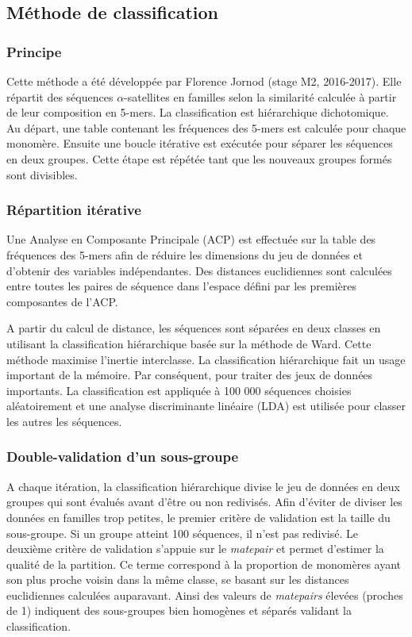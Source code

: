 \documentclass[12pt,a4paper]{article}
\begin{document}
\subsection{Méthode de classification}
	\subsubsection{Principe}
Cette méthode a été développée par Florence Jornod (stage M2, 2016-2017). Elle répartit des séquences $\alpha$-satellites en familles selon la similarité calculée à partir de leur composition en 5-mers. La classification est hiérarchique dichotomique. Au départ, une table contenant les fréquences des 5-mers est calculée pour chaque monomère. Ensuite une boucle itérative est exécutée pour séparer les séquences en deux groupes. Cette étape est répétée tant que les nouveaux groupes formés sont divisibles.

	\subsubsection{Répartition itérative}
Une Analyse en Composante Principale (ACP) est effectuée sur la table des fréquences des 5-mers afin de réduire les dimensions du jeu de données et d’obtenir des variables indépendantes. Des distances euclidiennes sont calculées entre toutes les paires de séquence dans l’espace défini par les premières composantes de l’ACP. 

A partir du calcul de distance, les séquences sont séparées en deux classes en utilisant la classification hiérarchique basée sur la méthode de Ward. Cette méthode maximise l’inertie interclasse. La classification hiérarchique fait un usage important de la mémoire. Par conséquent, pour traiter des jeux de données importants. La classification est appliquée à 100 000 séquences choisies aléatoirement et une analyse discriminante linéaire (LDA) est utilisée pour classer les autres les séquences.

	\subsubsection{Double-validation d'un sous-groupe}
A chaque itération, la classification hiérarchique divise le jeu de données en deux groupes qui sont évalués avant d'être ou non redivisés. Afin d'éviter de diviser les données en familles trop petites, le premier critère de validation est la taille du sous-groupe. Si un groupe atteint 100 séquences, il n'est pas redivisé. Le deuxième critère de validation s'appuie sur le \textit{matepair} et permet d'estimer la qualité de la partition. Ce terme correspond à la proportion de monomères ayant son plus proche voisin dans la même classe, se basant sur les distances euclidiennes calculées auparavant. Ainsi des valeurs de \textit{matepairs} élevées (proches de 1) indiquent des sous-groupes bien homogènes et séparés validant la classification.
\end{document}
